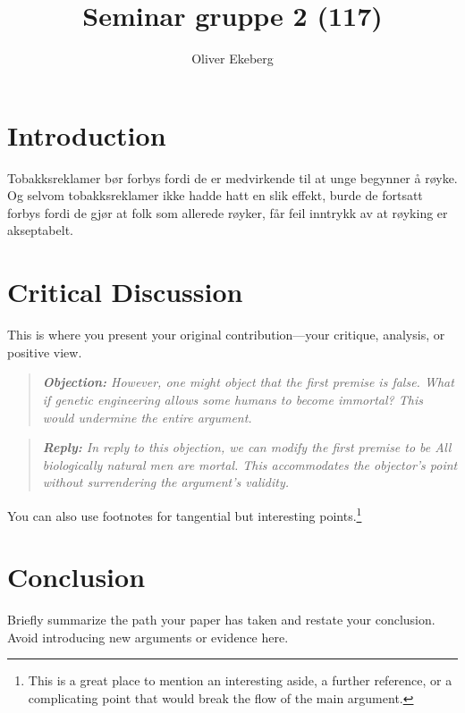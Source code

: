 \documentclass[11pt, a4paper]{article}
\title{Seminar gruppe 2 (117)}
\author{Oliver Ekeberg}
\date{}
\newenvironment{objection}{\begin{quote}\itshape\textbf{Objection: }}{\end{quote}} %
\newenvironment{reply}{\begin{quote}\itshape\textbf{Reply: }}{\end{quote}} %
\begin{document}
\maketitle

\tableofcontents


\section{Introduction}
\label{sec:introduction}


Tobakksreklamer bør forbys fordi de er medvirkende til at unge begynner å røyke. Og selvom tobakksreklamer ikke hadde
hatt en slik effekt, burde de fortsatt forbys fordi de gjør at folk som
allerede røyker, får feil inntrykk av at røyking er akseptabelt.






\section{Critical Discussion}
\label{sec:critical}

This is where you present your original contribution—your critique, analysis, or positive view.

\begin{objection}
    However, one might object that the first premise is false. What if genetic engineering allows some humans to become immortal? This would undermine the entire argument.
\end{objection}

\begin{reply}
    In reply to this objection, we can modify the first premise to be \textit{All biologically natural men are mortal}. This accommodates the objector's point without surrendering the argument's validity.
\end{reply}

You can also use footnotes for tangential but interesting points.\footnote{This is a great place to mention an interesting aside, a further reference, or a complicating point that would break the flow of the main argument.}

\section{Conclusion}
\label{sec:conclusion}

Briefly summarize the path your paper has taken and restate your conclusion. Avoid introducing new arguments or evidence here.

\printbibliography
\end{document}
